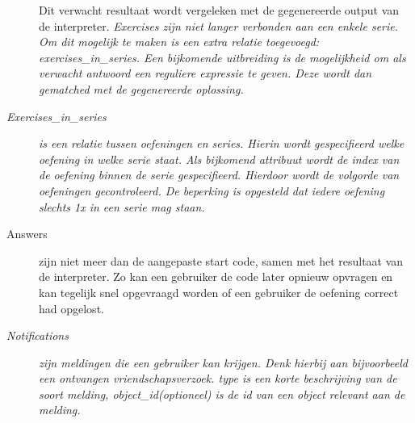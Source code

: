 \begin{description}
        Dit verwacht resultaat wordt vergeleken met de gegenereerde output van de interpreter. \textsl{Exercises
        zijn niet langer verbonden aan een enkele serie. Om dit mogelijk te maken is een extra relatie toegevoegd:
        exercises\_in\_series. Een bijkomende uitbreiding is de mogelijkheid om als verwacht antwoord een reguliere
        expressie te geven. Deze wordt dan gematched met de gegenereerde oplossing.}
    \item[\textsl{Exercises\_in\_series}] \textsl{is een relatie tussen oefeningen en series. Hierin wordt gespecifieerd welke oefening
        in welke serie staat. Als bijkomend attribuut wordt de index van de oefening binnen de serie gespecifieerd.
        Hierdoor wordt de volgorde van oefeningen gecontroleerd. De beperking is opgesteld dat iedere oefening slechts 1x
        in een serie mag staan.}
    \item[Answers] zijn niet meer dan de aangepaste start code, samen met het resultaat
        van de interpreter. Zo kan een gebruiker de code later opnieuw opvragen en kan tegelijk snel
        opgevraagd worden of een gebruiker de oefening correct had opgelost.
    \item[\textsl{Notifications}] \textsl{zijn meldingen die een gebruiker kan krijgen. Denk hierbij aan bijvoorbeeld een
        ontvangen vriendschapsverzoek. type is een korte beschrijving van de soort melding, object\_id(optioneel) is
        de id van een object relevant aan de melding.}
\end{description}
